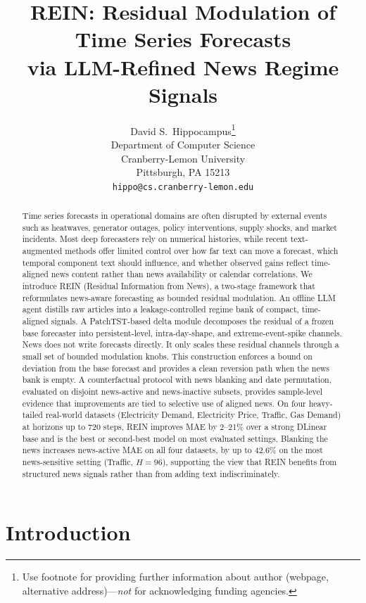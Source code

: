 \documentclass{article}
\title{REIN: Residual Modulation of Time Series Forecasts\\ via LLM-Refined News Regime Signals}
\author{%
  David S.~Hippocampus\thanks{Use footnote for providing further information
    about author (webpage, alternative address)---\emph{not} for acknowledging
    funding agencies.} \\
  Department of Computer Science\\
  Cranberry-Lemon University\\
  Pittsburgh, PA 15213 \\
  \texttt{hippo@cs.cranberry-lemon.edu} \\
}
\begin{document}
\maketitle

\begin{abstract}
Time series forecasts in operational domains are often disrupted by external events such as heatwaves, generator outages, policy interventions, supply shocks, and market incidents. Most deep forecasters rely on numerical histories, while recent text-augmented methods offer limited control over how far text can move a forecast, which temporal component text should influence, and whether observed gains reflect time-aligned news content rather than news availability or calendar correlations. We introduce REIN (Residual Information from News), a two-stage framework that reformulates news-aware forecasting as bounded residual modulation. An offline LLM agent distills raw articles into a leakage-controlled regime bank of compact, time-aligned signals. A PatchTST-based delta module decomposes the residual of a frozen base forecaster into persistent-level, intra-day-shape, and extreme-event-spike channels. News does not write forecasts directly. It only scales these residual channels through a small set of bounded modulation knobs. This construction enforces a bound on deviation from the base forecast and provides a clean reversion path when the news bank is empty. A counterfactual protocol with news blanking and date permutation, evaluated on disjoint news-active and news-inactive subsets, provides sample-level evidence that improvements are tied to selective use of aligned news. On four heavy-tailed real-world datasets (Electricity Demand, Electricity Price, Traffic, Gas Demand) at horizons up to 720 steps, REIN improves MAE by 2--21\% over a strong DLinear base and is the best or second-best model on most evaluated settings. Blanking the news increases news-active MAE on all four datasets, by up to 42.6\% on the most news-sensitive setting (Traffic, $H{=}96$), supporting the view that REIN benefits from structured news signals rather than from adding text indiscriminately.
\end{abstract}


\section{Introduction}
\label{sec:intro}
\end{document}
